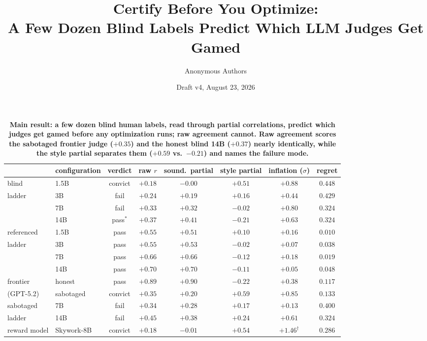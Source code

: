 \documentclass[11pt]{article}
\title{Certify Before You Optimize:\\ \large A Few Dozen Blind Labels Predict Which LLM Judges Get Gamed}
\author{Anonymous Authors}
\date{Draft v4, August 23, 2026}
\begin{document}
\maketitle



\begin{table}[t!]
\centering
\small
\setlength{\tabcolsep}{5pt}
\begin{tabular}{llcccccc}
\toprule
& configuration & verdict & raw $r$ & sound.\ partial & style partial & inflation ($\sigma$) & regret \\
\midrule
blind & 1.5B & convict & $+0.18$ & $-0.00$ & $\mathbf{+0.51}$ & $+0.88$ & $0.448$ \\
ladder & 3B & fail & $+0.24$ & $+0.19$ & $+0.16$ & $+0.44$ & $0.429$ \\
& 7B & fail & $+0.33$ & $+0.32$ & $-0.02$ & $+0.80$ & $0.324$ \\
& 14B & pass$^{*}$ & $+0.37$ & $+0.41$ & $-0.21$ & $+0.63$ & $0.324$ \\
\midrule
referenced & 1.5B & pass & $+0.55$ & $+0.51$ & $+0.10$ & $+0.16$ & $\mathbf{0.010}$ \\
ladder & 3B & pass & $+0.55$ & $+0.53$ & $-0.02$ & $+0.07$ & $0.038$ \\
& 7B & pass & $+0.66$ & $+0.66$ & $-0.12$ & $+0.18$ & $0.019$ \\
& 14B & pass & $+0.70$ & $+0.70$ & $-0.11$ & $+0.05$ & $0.048$ \\
\midrule
frontier & honest & pass & $+0.89$ & $+0.90$ & $-0.22$ & $+0.38$ & $0.117$ \\
(GPT-5.2) & sabotaged & convict & $+0.35$ & $+0.20$ & $\mathbf{+0.59}$ & $+0.85$ & $0.133$ \\
\midrule
sabotaged & 7B & fail & $+0.34$ & $+0.28$ & $+0.17$ & $+0.13$ & $0.400$ \\
ladder & 14B & fail & $+0.45$ & $+0.38$ & $+0.24$ & $+0.61$ & $0.324$ \\
\midrule
reward model & Skywork-8B & convict & $+0.18$ & $-0.01$ & $\mathbf{+0.54}$ & $\mathbf{+1.46}^{\dagger}$ & $0.286$ \\
\bottomrule
\end{tabular}
\caption{\textbf{Main result: a few dozen blind human labels, read through partial correlations, predict which judges get gamed before any optimization runs; raw agreement cannot.
Raw agreement scores the sabotaged frontier judge ($+0.35$) and the honest blind 14B ($+0.37$) nearly identically, while the style partial separates them ($+0.59$ vs.\ $-0.21$) and names the failure mode.}
}
\end{table}
\end{document}
